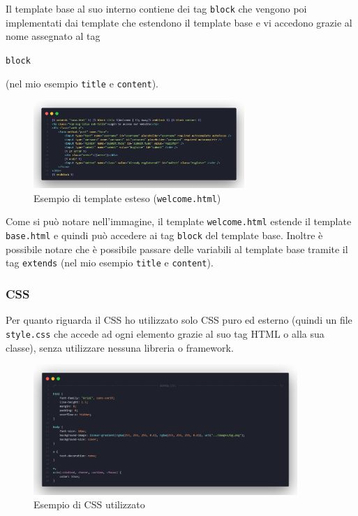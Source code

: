 \documentclass[12pt]{article}
\def\code#1{\texttt{#1}}
\begin{document}
\noindent
\justifying
Il template base al suo interno contiene dei tag \code{block} che vengono poi implementati dai template che estendono il template base e vi accedono grazie al nome assegnato al tag

\noindent\code{block}
\raggedright (nel mio esempio \code{title} e \code{content}).
\begin{figure}
    \includegraphics[width=8cm]{extend-template.png}
    \caption{Esempio di template esteso (\code{welcome.html})}
    \centering
\end{figure}
\justifying
Come si può notare nell'immagine, il template \code{welcome.html} estende il template \code{base.html} e quindi può accedere ai tag \code{block} del template base. Inoltre è possibile notare che è possibile passare delle variabili al template base tramite il tag \code{extends} (nel mio esempio \code{title} e \code{content}). \\

\subsubsection{CSS}

Per quanto riguarda il CSS ho utilizzato solo CSS puro ed esterno (quindi un file \code{style.css} che accede ad ogni elemento grazie al suo tag HTML o alla sua classe), senza utilizzare nessuna libreria o framework. \\
\begin{figure}[h]
    \includegraphics[width=10cm]{css.png}
    \centering
    \caption{Esempio di CSS utilizzato}
    \centering
\end{figure}
\end{document}
